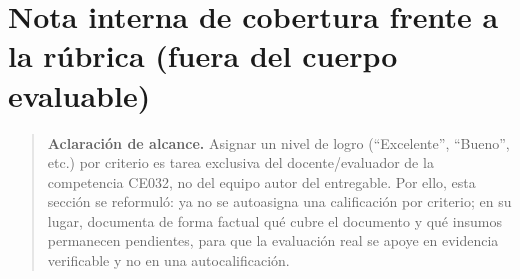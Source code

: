 \documentclass[11pt,a4paper]{article}
\begin{document}
\section{Nota interna de cobertura frente a la rúbrica (fuera del cuerpo evaluable)}\label{nota-interna-de-cobertura-frente-a-la-ruxfabrica-fuera-del-cuerpo-evaluable}

\begin{quote}
\textbf{Aclaración de alcance.} Asignar un nivel de logro (``Excelente'', ``Bueno'', etc.) por criterio es tarea exclusiva del docente/evaluador de la competencia CE032, no del equipo autor del entregable. Por ello, esta sección se reformuló: ya no se autoasigna una calificación por criterio; en su lugar, documenta de forma factual qué cubre el documento y qué insumos permanecen pendientes, para que la evaluación real se apoye en evidencia verificable y no en una autocalificación.
\end{quote}
\end{document}
